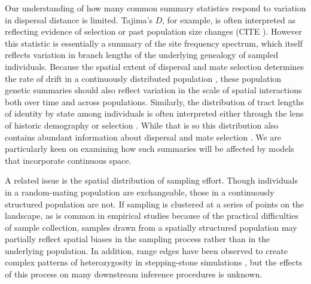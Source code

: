 \documentclass[11pt,twoside,lineno]{preprint}
\newif\ifcomments
\newcommand{\cjb}[1]{\ifcomments{{\color{orange} \it (#1)}}\else{}\fi}
\begin{document}
Our understanding of how many common summary statistics respond to variation in dispersal distance is limited. Tajima's $D$, for example, is often interpreted as reflecting evidence of selection or past population size changes (CITE \cjb{CJ: what's a good citation here?}). However this statistic is essentially a summary of the site frequency spectrum, which itself reflects variation in branch lengths of the underlying genealogy of sampled individuals. Because the spatial extent of dispersal and mate selection determines the rate of drift in a continuously distributed population \citep{Maruyama1972}, these population genetic summaries should also reflect variation in the scale of spatial interactions both over time and across populations. Similarly, the distribution of tract lengths of identity by state among individuals is often interpreted either through the lens of historic demography \citep{Harris2013} or selection \citep{Garud2015}. While that is so this distribution also contains abundant information about dispersal and mate selection \citep{Ringbauer2017,Baharian2016}. We are particularly keen on examining how such summaries will be affected by models that incorporate continuous space. 

A related issue is the spatial distribution of sampling effort. Though individuals in a random-mating population are exchangeable, those in a continuously structured population are not. If sampling is clustered at a series of points on the landscape, as is common in empirical studies because of the practical difficulties of sample collection, samples drawn from a spatially structured population may partially reflect spatial biases in the sampling process rather than in the underlying population. In addition, range edges have been observed to create complex patterns of heterozygosity in stepping-stone simulations \citep{Neel2013,Shirk2014}, but the effects of this process on many downstream inference procedures is unknown. \cjb{must be more out there on sampling -- any recs for papers to read+cite?}
\end{document}
